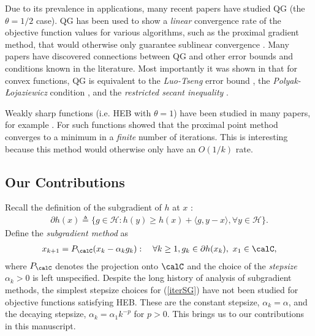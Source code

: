 \documentclass[smallextended]{svjour3}
\begin{document}
Due to its prevalence in applications, many recent papers have studied QG (the $\theta=1/2$ case). QG has been used to show a \emph{linear} convergence rate of the objective function values for various algorithms, such as the proximal gradient method, that would otherwise only guarantee sublinear convergence \cite{zhang2016new,beck2015linearly,zhou2015unified,karimi2016linear}. 
Many papers have discovered connections between QG and other error bounds and conditions known in the literature. Most importantly it was shown in \cite[Appendix A]{karimi2016linear} that for convex functions, QG is equivalent to the \emph{Luo-Tseng} error bound \cite{luo1993error}, the \emph{Polyak-{\L}ojaziewicz} condition \cite{karimi2016linear}, and the \emph{restricted secant inequality} \cite{zhang2013gradient}. 

Weakly sharp functions (i.e. HEB with $\theta=1$) have been studied in many papers, for example \cite{burke2002weak,ferris1991finite,pang1997error,shor2012minimization,nedic2010effect,poljak1978nonlinear,yang2015rsg,supittayapornpong2016staggered,attouch2013convergence}. For such functions \cite{ferris1991finite} showed that the proximal point method converges to a minimum in a \emph{finite} number of iterations. This is interesting because this method would otherwise only have an $O(1/k)$ rate. %



\subsection{Our Contributions}
Recall the definition of the subgradient of $h$ at $x$ \cite[Def. 16.1]{bauschke2011convex}:
\begin{eqnarray*}
\partial h(x) \triangleq \{g\in\mathcal{H}:h(y)\geq h(x)+\langle g,y-x\rangle, \forall y\in\mathcal{H}\}.
\label{eq:ineq3}
\end{eqnarray*}
Define the \emph{subgradient method} as 
\begin{eqnarray}\label{iterSG}
 x_{k+1}=P_{\calC}(x_k-\alpha_k g_k):\quad\forall k\geq 1, g_k\in\partial h(x_k),\,\, x_1\in \calC,
 \end{eqnarray}
where $P_{\calC}$ denotes the projection onto $\calC$ and the choice of the \emph{stepsize} $\alpha_k>0$ is left unspecified. 
 Despite the long history of analysis of subgradient methods, the simplest stepsize choices for (\ref{iterSG}) have not been studied for objective functions satisfying HEB. These are the constant stepsize, $\alpha_k=\alpha$, and the decaying stepsize, $\alpha_k=\alpha_1 k^{-p}$ for $p>0$. This brings us to our contributions in this manuscript. 
\end{document}
